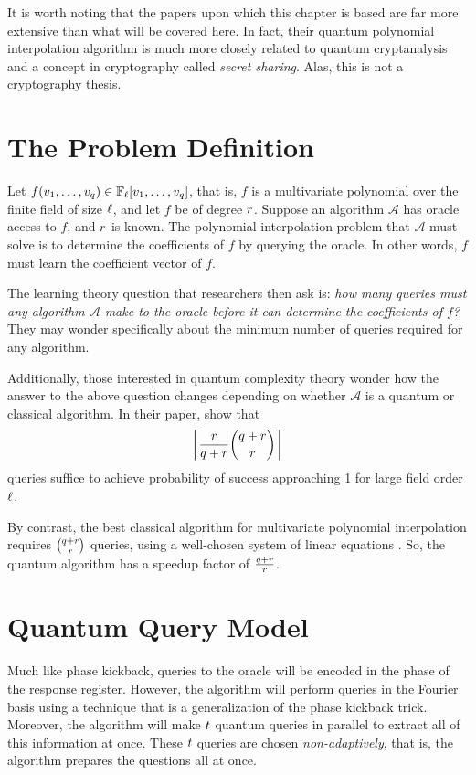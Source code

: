 \documentclass[12pt,twoside]{reedthesis}
\theoremstyle{definition}
\newcommand{\F}{\mathbb{F}}
\begin{document}
It is worth noting that the papers upon which this chapter is based are far more extensive than what will be covered here. In fact, their quantum polynomial interpolation algorithm is much more closely related to quantum cryptanalysis and a concept in cryptography called \textit{secret sharing}. Alas, this is not a cryptography thesis.

\section{The Problem Definition}
Let $f(\inv1, \ldots, \inv\numin)\in \F_\fsize[\inv1, \ldots, \inv\numin]$, that is, $f$ is a multivariate polynomial over the finite field of size $\ell$, and let $f$ be of degree $r$. Suppose an algorithm $\mathcal{A}$ has oracle access to $f$, and $r$ is known. The polynomial interpolation problem that $\mathcal{A}$ must solve is to determine the coefficients of $f$ by querying the oracle. In other words, $f$ must learn the coefficient vector of $f$.

The learning theory question that researchers then ask is: \textit{how many queries must any algorithm $\mathcal{A}$ make to the oracle before it can determine the coefficients of $f$?} They may wonder specifically about the minimum number of queries required for any algorithm.

Additionally, those interested in quantum complexity theory wonder how the answer to the above question changes depending on whether $\mathcal{A}$ is a quantum or classical algorithm. In their paper, \citep{chen2018quantum} show that 
\begin{equation*}
\left \lceil \frac{r}{q + r} { q + r \choose r} \right \rceil
\end{equation*}
queries suffice to achieve probability of success approaching 1 for large field order $\ell$.

By contrast, the best classical algorithm for multivariate polynomial interpolation requires ${q+r \choose r}$ queries, using a well-chosen system of linear equations \citep{chen2018quantum}. So, the quantum algorithm has a speedup factor of $\frac{q + r}{r}$.

\section{Quantum Query Model}
Much like phase kickback, queries to the oracle will be encoded in the phase of the response register. However, the algorithm will perform queries in the Fourier basis using a technique that is a generalization of the phase kickback trick. Moreover, the algorithm will make $t$ quantum queries in parallel to extract all of this information at once. These $t$ queries are chosen \textit{non-adaptively}, that is, the algorithm prepares the questions all at once.
\end{document}

